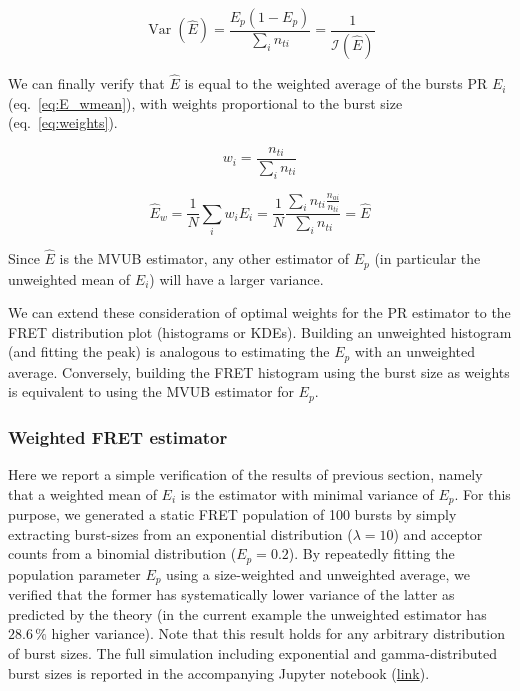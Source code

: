 \documentclass[10pt,letterpaper]{article}
\begin{document}
\begin{equation}
\label{eq:E_variance}
\operatorname{Var}(\hat{E}) = \frac{E_p (1 - E_p)}{\sum_i n_{ti}} = \frac{1}{\mathcal{I}(\hat{E})}
\end{equation}

We can finally verify that $\hat{E}$ is equal to the weighted average of the bursts
PR $E_i$ (eq.~\ref{eq:E_wmean}), with weights proportional to the burst size (eq.~\ref{eq:weights}).

\begin{equation}
\label{eq:weights}
w_i
= \frac{n_{ti}}{\sum_i n_{ti}}
\end{equation}

\begin{equation}
\label{eq:E_wmean}
\hat{E}_w = \frac{1}{N} \sum_i w_i E_i 
= \frac{1}{N} \frac{\sum_i n_{ti} \frac{n_{ai}}{n_{ti}} }{\sum_i n_{ti}} = \hat{E}
\end{equation}

Since $\hat{E}$ is the MVUB estimator, any other estimator of $E_p$ (in particular 
the unweighted mean of $E_i$) will have a larger variance.

We can extend these consideration of optimal weights for 
the PR estimator to the FRET distribution plot (histograms or KDEs). Building an
unweighted histogram (and fitting the peak) is analogous to estimating the 
$E_p$ with an unweighted average. Conversely, building the FRET histogram
using the burst size as weights is equivalent to using
the MVUB estimator for $E_p$.

\subsubsection{Weighted FRET estimator}
Here we report a simple verification of the results of previous section, namely
that a weighted mean of $E_i$ is the estimator with minimal variance of $E_p$.
For this purpose, we generated a static FRET population of 100 bursts 
by simply extracting burst-sizes from an exponential distribution ($\lambda = 10$)
and acceptor counts from a binomial distribution ($E_p = 0.2$). 
By repeatedly fitting the population parameter $E_p$ using a 
size-weighted and unweighted average, we verified that the former has systematically
lower variance of the latter as predicted by the theory
(in the current example the unweighted estimator has $28.6\,\%$ higher variance). 
Note that this result
holds for any arbitrary distribution of burst sizes. The full simulation 
including exponential and gamma-distributed burst sizes is reported in
the accompanying Jupyter notebook (\href{http://nbviewer.jupyter.org/github/tritemio/fretbursts_paper/blob/master/notebooks/Figures%20-%20Burst%20Weights.ipynb}{link}).
\end{document}
